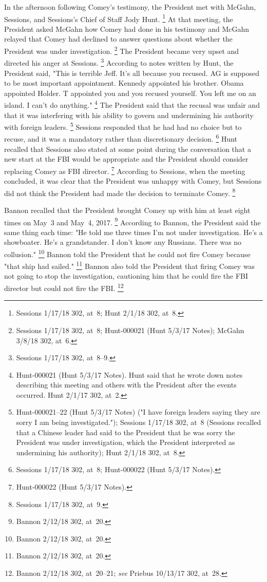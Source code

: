 In the afternoon following Comey's testimony, the President met with McGahn, Sessions, and Sessions's Chief of Staff Jody Hunt.%
\footnote{Sessions 1/17/18 302, at~8;
Hunt 2/1/18 302, at~8.}
At that meeting, the President asked McGahn how Comey had done in his testimony and McGahn relayed that Comey had declined to answer questions about whether the President was under investigation.%
\footnote{Sessions 1/17/18 302, at~8;
Hunt-000021 (Hunt 5/3/17 Notes);
McGahn 3/8/18 302, at~6.}
The President became very upset and directed his anger at Sessions.%
\footnote{Sessions 1/17/18 302, at~8--9.}
According to notes written by Hunt, the President said, "This is terrible Jeff.
It's all because you recused.
AG is supposed to be most important appointment.
Kennedy appointed his brother.
Obama appointed Holder. T appointed you and you recused yourself.
You left me on an island.
I can't do anything."%
\footnote{Hunt-000021 (Hunt 5/3/17 Notes).
Hunt said that he wrote down notes describing this meeting and others with the President after the events occurred.
Hunt 2/1/17 302, at~2.}
The President said that the recusal was unfair and that it was interfering with his ability to govern and undermining his authority with foreign leaders.%
\footnote{Hunt-000021--22 (Hunt 5/3/17 Notes) ("I have foreign leaders saying they are sorry I am being investigated.");
Sessions 1/17/18 302, at~8 (Sessions recalled that a Chinese leader had said to the President that he was sorry the President was under investigation, which the President interpreted as undermining his authority);
Hunt 2/1/18 302, at~8.}
Sessions responded that he had had no choice but to recuse, and it was a mandatory rather than discretionary decision.%
\footnote{Sessions 1/17/18 302, at~8;
Hunt-000022 (Hunt 5/3/17 Notes).}
Hunt recalled that Sessions also stated at some point during the conversation that a new start at the FBI would be appropriate and the President should consider replacing Comey as FBI director.%
\footnote{Hunt-000022 (Hunt 5/3/17 Notes).}
According to Sessions, when the meeting concluded, it was clear that the President was unhappy with Comey, but Sessions did not think the President had made the decision to terminate Comey.%
\footnote{Sessions 1/17/18 302, at~9.}

Bannon recalled that the President brought Comey up with him at least eight times on May~3 and May~4, 2017.%
\footnote{Bannon 2/12/18 302, at~20.}
According to Bannon, the President said the same thing each time:
"He told me three times I'm not under investigation.
He's a showboater.
He's a grandstander.
I don't know any Russians.
There was no collusion."%
\footnote{Bannon 2/12/18 302, at~20.}
Bannon told the President that he could not fire Comey because "that ship had sailed."%
\footnote{Bannon 2/12/18 302, at~20.}
Bannon also told the President that firing Comey was not going to stop the investigation, cautioning him that he could fire the FBI director but could not fire the FBI\null.%
\footnote{Bannon 2/12/18 302, at~20--21;
\textit{see} Priebus 10/13/17 302, at~28.}

